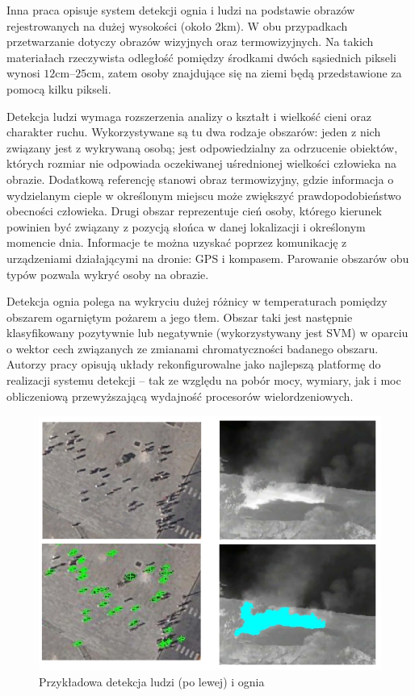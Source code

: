 Inna praca \cite{FIRE} opisuje system detekcji ognia i ludzi na podstawie obrazów rejestrowanych na dużej wysokości (około 2km). 
W obu przypadkach przetwarzanie dotyczy obrazów wizyjnych oraz termowizyjnych. 
Na takich materiałach rzeczywista odległość pomiędzy środkami dwóch sąsiednich pikseli wynosi $12$cm--$25$cm, zatem osoby znajdujące się na ziemi będą przedstawione za pomocą kilku pikseli.

Detekcja ludzi wymaga rozszerzenia analizy o kształt i wielkość cieni oraz charakter ruchu. 
Wykorzystywane są tu dwa rodzaje obszarów: jeden z nich związany jest z wykrywaną osobą; jest odpowiedzialny za odrzucenie obiektów, których rozmiar nie odpowiada oczekiwanej uśrednionej wielkości człowieka na obrazie. 
Dodatkową referencję stanowi obraz termowizyjny, gdzie informacja o wydzielanym cieple w określonym miejscu może zwiększyć prawdopodobieństwo obecności człowieka. 
Drugi obszar reprezentuje cień osoby, którego kierunek powinien być związany z pozycją słońca w danej lokalizacji i określonym momencie dnia. 
Informacje te można uzyskać poprzez komunikację z urządzeniami działającymi na dronie: GPS i kompasem. 
Parowanie obszarów obu typów pozwala wykryć osoby na obrazie.

Detekcja ognia polega na wykryciu dużej różnicy w temperaturach pomiędzy obszarem ogarniętym pożarem a jego tłem. 
Obszar taki jest następnie klasyfikowany pozytywnie lub negatywnie (wykorzystywany jest SVM) w oparciu o wektor cech związanych ze zmianami chromatyczności badanego obszaru. %
Autorzy pracy opisują układy rekonfigurowalne jako najlepszą platformę do realizacji systemu detekcji  -- tak ze względu na pobór mocy, wymiary, jak i moc obliczeniową przewyższającą wydajność procesorów wielordzeniowych.
\begin{figure}[h]
	\centering
	\includegraphics[width=12cm]{fire.png}
	\caption{Przykładowa detekcja ludzi (po lewej) i ognia \cite{FIRE}}
	\label{fig:fire}
\end{figure}


